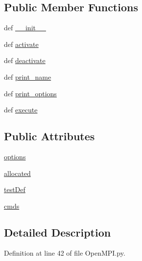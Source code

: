\subsection*{Public Member Functions}
\begin{DoxyCompactItemize}
\item 
def \hyperlink{classOpenMPI_1_1OpenMPI_a98c85be81f92e692e8087d08c45ebd09}{\-\_\-\-\_\-init\-\_\-\-\_\-}
\item 
def \hyperlink{classOpenMPI_1_1OpenMPI_a446b9a62139dfc9065f4cc21450ed7f9}{activate}
\item 
def \hyperlink{classOpenMPI_1_1OpenMPI_ae235afe3cd4dfc210b7e8d045a108e5b}{deactivate}
\item 
def \hyperlink{classOpenMPI_1_1OpenMPI_a3b39e0c05069fd14533b0a528ac58001}{print\-\_\-name}
\item 
def \hyperlink{classOpenMPI_1_1OpenMPI_a6a912a2ac2d80ba6ac2d6595aa661268}{print\-\_\-options}
\item 
def \hyperlink{classOpenMPI_1_1OpenMPI_a4339bc2f6d52dce9bdd0818e7ce686d2}{execute}
\end{DoxyCompactItemize}
\subsection*{Public Attributes}
\begin{DoxyCompactItemize}
\item 
\hyperlink{classOpenMPI_1_1OpenMPI_a4a263774614f0b83a63a26639b46b2f5}{options}
\item 
\hyperlink{classOpenMPI_1_1OpenMPI_a9ffab4795264fde34d136269026204db}{allocated}
\item 
\hyperlink{classOpenMPI_1_1OpenMPI_acd20b78013350c2363484589ef85b67c}{test\-Def}
\item 
\hyperlink{classOpenMPI_1_1OpenMPI_a86be93bbc775c81263813274a8564efc}{cmds}
\end{DoxyCompactItemize}


\subsection{Detailed Description}


Definition at line 42 of file Open\-M\-P\-I.\-py.



